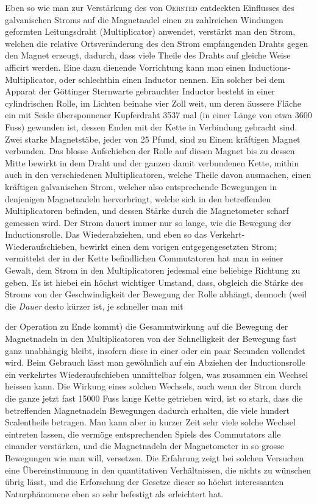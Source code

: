 Eben so wie man zur Verstärkung des von \textsc{Oersted} entdeckten Einflusses des galvanischen Stroms auf die Magnetnadel einen zu zahlreichen Windungen geformten Leitungsdraht (Multiplicator) anwendet, verstärkt man den Strom, welchen die relative Ortsveränderung des den Strom empfangenden Drahts gegen den Magnet erzeugt, dadurch, dass viele Theile des Drahts auf gleiche Weise afficirt werden. Eine dazu dienende Vorrichtung kann man einen Inductions-Multiplicator, oder schlechthin einen Inductor nennen. Ein solcher bei dem Apparat der Göttinger Sternwarte gebrauchter Inductor besteht in einer cylindrischen Rolle, im Lichten beinahe vier Zoll weit, um deren äussere Fläche ein mit Seide übersponnener Kupferdraht 3537 mal (in einer Länge von etwa 3600 Fuss) gewunden ist, dessen Enden mit der Kette in Verbindung gebracht sind. Zwei starke Magnetstäbe, jeder von 25 Pfund, sind zu Einem kräftigen Magnet verbunden. Das blosse Aufschieben der Rolle auf diesen Magnet bis zu dessen Mitte bewirkt in dem Draht und der ganzen damit verbundenen Kette, mithin auch in den verschiedenen Multiplicatoren, welche Theile davon ausmachen, einen kräftigen galvanischen Strom, welcher also entsprechende Bewegungen in denjenigen Magnetnadeln hervorbringt, welche sich in den betreffenden Multiplicatoren befinden, und dessen Stärke durch die Magnetometer scharf gemessen wird. Der Strom dauert immer nur so lange, wie die Bewegung der Inductionsrolle. Das Wiederabziehen, und eben so das Verkehrt-Wiederaufschieben, bewirkt einen dem vorigen entgegengesetzten Strom; vermittelst der in der Kette befindlichen Commutatoren hat man in seiner Gewalt, dem Strom in den Multiplicatoren jedesmal eine beliebige Richtung zu geben. Es ist hiebei ein höchst wichtiger Umstand, dass, obgleich die Stärke des Stroms von der Geschwindigkeit der Bewegung der Rolle abhängt, dennoch (weil die \textit{Dauer} desto kürzer ist, je schneller man mit
\par\clearpage
{}
\noindent der Operation zu Ende kommt) die Gesammtwirkung auf die Bewegung der Magnetnadeln in den Multiplicatoren von der Schnelligkeit der Bewegung fast ganz unabhängig bleibt, insofern diese in einer oder ein paar Secunden vollendet wird. Beim Gebrauch lässt man gewöhnlich auf ein Abziehen der Inductionsrolle ein verkehrtes Wiederaufschieben unmittelbar folgen, was zusammen ein Wechsel heissen kann. Die Wirkung eines solchen Wechsels, auch wenn der Strom durch die ganze jetzt fast 15000 Fuss lange Kette getrieben wird, ist so stark, dass die betreffenden Magnetnadeln Bewegungen dadurch erhalten, die viele hundert Scalentheile betragen. Man kann aber in kurzer Zeit sehr viele solche Wechsel eintreten lassen, die vermöge entsprechenden Spiels des Commutators alle einander verstärken, und die Magnetnadeln der Magnetometer in so grosse Bewegungen wie man will, versetzen. Die Erfahrung zeigt bei solchen Versuchen eine Übereinstimmung in den quantitativen Verhältnissen, die nichts zu wünschen übrig lässt, und die Erforschung der Gesetze dieser so höchst interessanten Naturphänomene eben so sehr befestigt als erleichtert hat.

